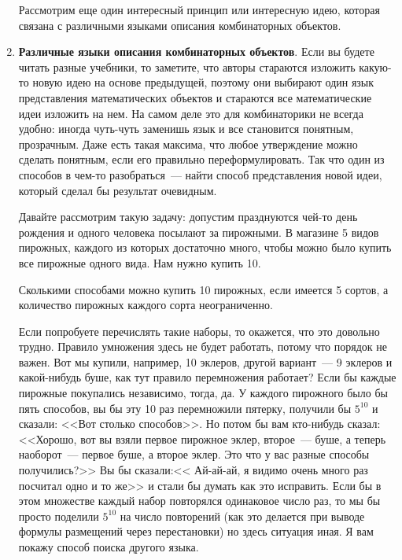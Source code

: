 \documentclass[russian]{lecture-notes}
\theoremstyle{definition}
\begin{document}
\begin{enumerate}
		Рассмотрим еще один интересный принцип или интересную идею, которая связана с различными языками описания комбинаторных объектов.
		
		
		\item \textbf{Различные языки описания комбинаторных объектов}. Если вы будете читать разные учебники, то заметите, что авторы стараются изложить какую-то новую идею на основе предыдущей, поэтому они выбирают один язык представления математических объектов и стараются все математические идеи изложить на нем. На самом деле это для комбинаторики не всегда удобно: иногда чуть-чуть заменишь язык и все становится понятным, прозрачным. Даже есть такая максима, что любое утверждение можно сделать понятным, если его правильно переформулировать. Так что один из способов в чем-то разобраться~--- найти способ представления новой идеи, который сделал бы результат очевидным.
		
		Давайте рассмотрим такую задачу: допустим празднуются чей-то день рождения и одного человека посылают за пирожными. В магазине 5 видов пирожных, каждого из которых достаточно много, чтобы можно было купить все пирожные одного вида. Нам нужно купить 10.
		
		
		\begin{problem}
			Сколькими способами можно купить 10 пирожных, если имеется 5 сортов, а количество пирожных каждого сорта неограниченно.
		\end{problem}
	
		Если попробуете перечислять такие наборы, то окажется, что это довольно трудно. Правило умножения здесь не будет работать, потому что порядок не важен. Вот мы купили, например, 10 эклеров, другой вариант~--- 9 эклеров и какой-нибудь буше, как тут правило перемножения работает? Если бы каждые пирожные покупались независимо, тогда, да. У каждого пирожного было бы пять способов, вы бы эту 10 раз перемножили пятерку, получили бы $5^{10}$ и сказали: <<Вот столько способов>>. Но потом бы вам кто-нибудь сказал: <<Хорошо, вот вы взяли первое пирожное эклер, второе~--- буше, а теперь наоборот~--- первое буше, а второе эклер. Это что у вас разные способы получились?>> Вы бы сказали:<< Ай-ай-ай, я видимо очень много раз посчитал одно и то же>> и стали бы думать как это исправить. Если бы в этом множестве каждый набор повторялся одинаковое число раз, то мы бы просто поделили $5^{10}$ на число повторений (как это делается при выводе формулы размещений через перестановки) но здесь ситуация иная. Я вам покажу способ поиска другого языка.
		

\end{enumerate}
\end{document}
